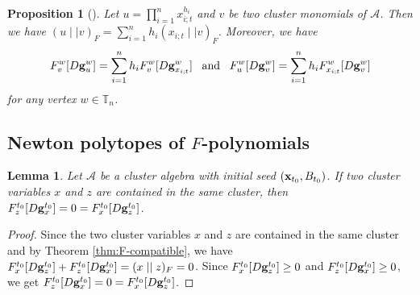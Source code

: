 \documentclass[10pt]{amsart}
\newtheorem{proposition}[theorem]{Proposition}
\newtheorem{lemma}[theorem]{Lemma}
\theoremstyle{definition}
\theoremstyle{remark}
\numberwithin{equation}{section}
\begin{document}
\begin{proposition}[{\cite[Propositions 4.9, 4.16]{Cao-2023}}] \label{pro:F-additive}
   Let $u=\prod_{i=1}^nx_{i;t}^{h_i}$ and $v$ be two cluster monomials of $\mathcal A$. Then we have $(u\mid\mid v)_F=\sum_{i=1}^nh_i(x_{i;t}\mid\mid v)_F$. Moreover, we have
   \[ F_{v}^{w}[D{\bf g}_u^{w}]=\sum_{i=1}^nh_iF_{v}^w[D{\bf g}_{x_{i;t}}^w]\;\;\;\text{and}\;\;\;F_u^w[D{\bf g}_{v}^w]=\sum_{i=1}^nh_iF_{x_{i;t}}^w[D{\bf g}_{v}^w]
   \]
   for any vertex $w\in\mathbb T_n$.
\end{proposition}


\subsection{Newton polytopes of $F$-polynomials}

\begin{lemma} \label{lem:F-zx=0}
Let $\mathcal A$ be a cluster algebra with initial seed $({\bf x}_{t_0}, B_{t_0})$. If two cluster variables $x$ and $z$ are contained in the same cluster,
then $F_z^{t_0}[D{\bf g}_x^{t_0}]=0=F_x^{t_0}[D{\bf g}_z^{t_0}]$.
\end{lemma}
\begin{proof}
 Since the two cluster variables $x$ and $z$ are contained in the same cluster and by Theorem \ref{thm:F-compatible}, we have $F_x^{t_0}[D{\bf g}_z^{t_0}]+F_z^{t_0}[D{\bf g}_x^{t_0}]=(x\mid\mid z)_F=0$.  Since $F_x^{t_0}[D{\bf g}_z^{t_0}]\geq 0$ and $F_z^{t_0}[D{\bf g}_x^{t_0}]\geq 0$, we get $F_z^{t_0}[D{\bf g}_x^{t_0}]=0=F_x^{t_0}[D{\bf g}_z^{t_0}]$.
\end{proof}
\end{document}

